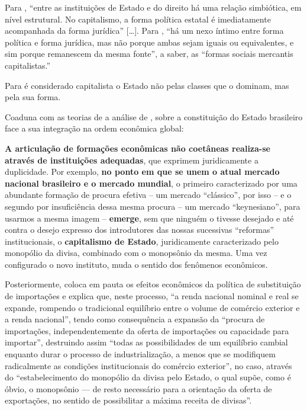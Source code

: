 \documentclass[
	10pt,				%
	openright,			%
	twoside,			%
	a5paper,			%
	english,			%
	french,				%
	spanish,			%
	brazil				%
	]{abntex2}
\renewenvironment{quote}
  {\small\list{}{\rightmargin=0.1cm \leftmargin=4cm}%
   \item\relax}
  {\endlist}
\begin{document}
Para , ``entre as instituições de Estado e do
direito há uma relação simbiótica, em nível estrutural. No capitalismo,
a forma política estatal é imediatamente acompanhada da forma jurídica''
{[}\ldots{}{]}. Para , ``há um nexo íntimo
entre forma política e forma jurídica, mas não porque ambas sejam iguais
ou equivalentes, e sim porque remanescem da mesma fonte'', a saber, as
``formas sociais mercantis capitalistas.''

Para  é considerado capitalista o Estado não
pelas classes que o dominam, mas pela sua forma.

Coaduna com as teorias de  a análise de
, sobre a constituição
do Estado brasileiro face a sua integração na ordem econômica global:

\begin{quote}
\textbf{A articulação de formações econômicas não coetâneas realiza-se
através de instituições adequadas}, que exprimem juridicamente a
duplicidade. Por exemplo, \textbf{no ponto em que se unem o atual
mercado nacional brasileiro e o mercado mundial}, o primeiro
caracterizado por uma abundante formação de procura efetiva -- um
mercado ``clássico'', por isso -- e o segundo por insuficiência dessa
mesma procura -- um mercado ``keynesiano'', para usarmos a mesma imagem
-- \textbf{emerge}, sem que ninguém o tivesse desejado e até contra o
desejo expresso dos introdutores das nossas sucessivas ``reformas''
institucionais, o \textbf{capitalismo de Estado}, juridicamente
caracterizado pelo monopólio da divisa, combinado com o monopsônio da
mesma. Uma vez configurado o novo instituto, muda o sentido dos
fenômenos econômicos.
\end{quote}

Posteriormente,  coloca em pauta os
efeitos econômicos da política de substituição de importações e explica
que, neste processo, ``a renda nacional nominal e real se expande,
rompendo o tradicional equilíbrio entre o volume de comércio exterior e
a renda nacional'', tendo como consequência a expansão da ``procura de
importações, independentemente da oferta de importações ou capacidade
para importar'', destruindo assim ``todas as possibilidades de um
equilíbrio cambial enquanto durar o processo de industrialização, a
menos que se modifiquem radicalmente as condições institucionais do
comércio exterior'', no caso, através do ``estabelecimento do monopólio
da divisa pelo Estado, o qual supõe, como é óbvio, o monopsônio --- de
resto necessário para a orientação da oferta de exportações, no sentido
de possibilitar a máxima receita de divisas''.
\end{document}

